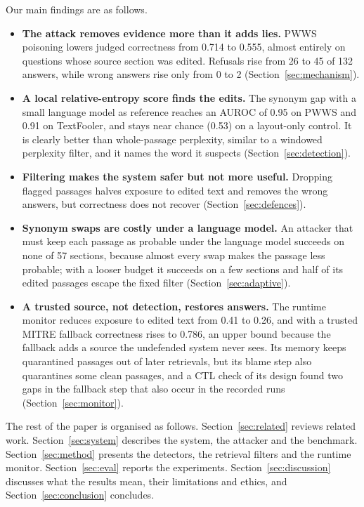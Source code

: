 \documentclass[10pt,journal,compsoc]{IEEEtran}
\begin{document}
Our main findings are as follows.
\begin{itemize}
\item \textbf{The attack removes evidence more than it adds lies.} PWWS poisoning lowers judged correctness from 0.714 to 0.555, almost entirely on questions whose source section was edited. Refusals rise from 26 to 45 of 132 answers, while wrong answers rise only from 0 to 2 (Section~\ref{sec:mechanism}).
\item \textbf{A local relative-entropy score finds the edits.} The synonym gap with a small language model as reference reaches an AUROC of 0.95 on PWWS and 0.91 on TextFooler, and stays near chance (0.53) on a layout-only control. It is clearly better than whole-passage perplexity, similar to a windowed perplexity filter, and it names the word it suspects (Section~\ref{sec:detection}).
\item \textbf{Filtering makes the system safer but not more useful.} Dropping flagged passages halves exposure to edited text and removes the wrong answers, but correctness does not recover (Section~\ref{sec:defences}).
\item \textbf{Synonym swaps are costly under a language model.} An attacker that must keep each passage as probable under the language model succeeds on none of 57 sections, because almost every swap makes the passage less probable; with a looser budget it succeeds on a few sections and half of its edited passages escape the fixed filter (Section~\ref{sec:adaptive}).
\item \textbf{A trusted source, not detection, restores answers.} The runtime monitor reduces exposure to edited text from 0.41 to 0.26, and with a trusted MITRE fallback correctness rises to 0.786, an upper bound because the fallback adds a source the undefended system never sees. Its memory keeps quarantined passages out of later retrievals, but its blame step also quarantines some clean passages, and a CTL check of its design found two gaps in the fallback step that also occur in the recorded runs (Section~\ref{sec:monitor}).
\end{itemize}

The rest of the paper is organised as follows. Section~\ref{sec:related} reviews related work. Section~\ref{sec:system} describes the system, the attacker and the benchmark. Section~\ref{sec:method} presents the detectors, the retrieval filters and the runtime monitor. Section~\ref{sec:eval} reports the experiments. Section~\ref{sec:discussion} discusses what the results mean, their limitations and ethics, and Section~\ref{sec:conclusion} concludes.
\end{document}
